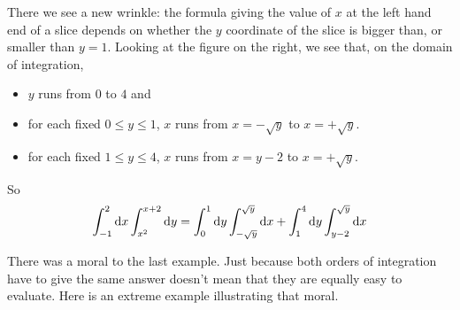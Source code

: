 \begin{eg}
There we see a new wrinkle:
the formula giving the value of $x$ at the left hand end of a slice
depends on whether the $y$ coordinate of the slice is bigger than, or smaller
than $y=1$. Looking at the figure on the right, we see that,
on the domain of integration,
\begin{itemize}
\item
$y$ runs from $0$ to $4$ and
\item
for each fixed $0\le y\le 1$, $x$ runs from $x=-\sqrt{y}$ to $x=+\sqrt{y}$.
\item
for each fixed $1\le y\le 4$, $x$ runs from $x=y-2$ to $x=+\sqrt{y}$.
\end{itemize} 
So
\begin{align*}
\int_{-1}^2\mathrm{d}x\int_{x^2}^{x+2}\mathrm{d}y
=\int_0^1\mathrm{d}y\int_{-\sqrt{y}}^{\sqrt{y}}\mathrm{d}x
  + \int_1^4\mathrm{d}y\int_{y-2}^{\sqrt{y}}\mathrm{d}x
\end{align*}
\end{eg}

There was a moral to the last example. Just because both orders of integration
have to give the same answer doesn't mean that they are equally easy to evaluate. Here is an extreme example illustrating that moral.

